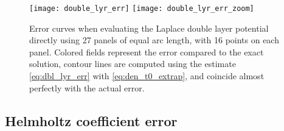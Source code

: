 \documentclass[hidelinks]{siamart1116}
\begin{document}
\begin{figure}[htbp]
  \centering
  
  \texttt{[image: double\_lyr\_err]}
  \texttt{[image: double\_lyr\_err\_zoom]}
  \caption{Error curves when evaluating the Laplace double layer
    potential directly using 27 panels of equal arc length, with 16
    points on each panel. Colored fields represent the error compared
    to the exact solution, contour lines are computed using the
    estimate \eqref{eq:dbl_lyr_err} with \eqref{eq:den_t0_extrap}, and
    coincide almost perfectly with the actual error.}
  \label{fig:dbl_lyr_err}
\end{figure}

\subsection{Helmholtz coefficient error}
\end{document}
